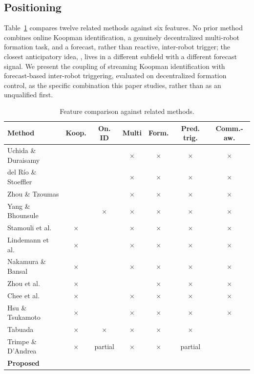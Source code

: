 \documentclass[10pt,conference]{IEEEtran}
\newcommand{\yes}{\checkmark}
\newcommand{\no}{$\times$}
\begin{document}
\subsection{Positioning}
Table~\ref{tab:novelty} compares twelve related methods against six features. No prior method combines online Koopman identification, a genuinely decentralized multi-robot formation task, and a forecast, rather than reactive, inter-robot trigger; the closest anticipatory idea, \cite{trimpe2014}, lives in a different subfield with a different forecast signal. We present the coupling of streaming Koopman identification with forecast-based inter-robot triggering, evaluated on decentralized formation control, as the specific combination this paper studies, rather than as an unqualified first.

\begin{table}[t]
\centering
\caption{Feature comparison against related methods.}
\label{tab:novelty}
\scriptsize
\setlength{\tabcolsep}{3pt}
\begin{tabular}{lcccccc}
\toprule
Method & Koop. & On. ID & Multi & Form. & Pred. trig. & Comm.-aw. \\
\midrule
Uchida \& Duraisamy \cite{uchida2024}        & \yes & \yes & \no  & \no  & \no  & \no \\
del R\'io \& Stoeffler \cite{delrio2025}      & \yes & \yes & \no  & \no  & \no  & \no \\
Zhou \& Tzoumas \cite{zhoutzoumas2025}         & \yes & \yes & \no  & \no  & \no  & \no \\
Yang \& Bhounsule \cite{yang2025}              & \yes & \no  & \no  & \no  & \no  & \no \\
Stamouli et al.\ \cite{stamouli2024}           & \no  & \yes & \no  & \no  & \no  & \no \\
Lindemann et al.\ \cite{lindemann2023}         & \no  & \yes & \no  & \no  & \no  & \no \\
Nakamura \& Bansal \cite{nakamura2022}         & \no  & \yes & \no  & \no  & \no  & \no \\
Zhou et al.\ \cite{zhouzhangluo2024}           & \no  & \yes & \yes & \no  & \no  & \no \\
Chee et al.\ \cite{chee2024}                   & \no  & \yes & \no  & \no  & \no  & \no \\
Hsu \& Tsukamoto \cite{hsu2025}                & \no  & \yes & \no  & \no  & \no  & \no \\
Tabuada \cite{tabuada2007}                     & \no  & \no  & \no  & \no  & \no  & \yes \\
Trimpe \& D'Andrea \cite{trimpe2014}           & \no  & partial & \no & \no & partial & \yes \\
\textbf{Proposed}                              & \yes & \yes & \yes & \yes & \yes & \yes \\
\bottomrule
\end{tabular}
\end{table}
\end{document}
